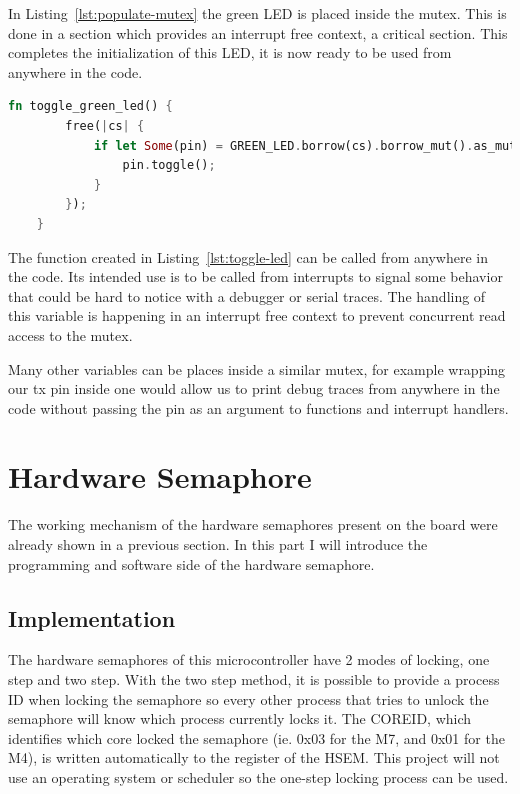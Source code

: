In Listing~\ref{lst:populate-mutex} the green LED is placed inside the mutex. This is done in a  section which provides an interrupt free context, a critical section. This completes the initialization of this LED, it is now ready to be used from anywhere in the code.

\begin{lstlisting}[language=Rust,frame=single,float=!ht,style=customrust,label={lst:toggle-led},caption={A LED Toggle Function}]
    fn toggle_green_led() {
        free(|cs| {
            if let Some(pin) = GREEN_LED.borrow(cs).borrow_mut().as_mut() {
                pin.toggle();
            }
        });
    }
\end{lstlisting}

The function created in Listing~\ref{lst:toggle-led} can be called from anywhere in the code. Its intended use is to be called from interrupts to signal some behavior that could be hard to notice with a debugger or serial traces. The handling of this variable is happening in an interrupt free context to prevent concurrent read access to the mutex.

Many other variables can be places inside a similar mutex, for example wrapping our tx pin inside one would allow us to print debug traces from anywhere in the code without passing the pin as an argument to functions and interrupt handlers.

\section{Hardware Semaphore}

The working mechanism of the hardware semaphores present on the board were already shown in a previous section. In this part I will introduce the programming and software side of the hardware semaphore.

\subsection{Implementation}

The hardware semaphores of this microcontroller have 2 modes of locking, one step and two step. With the two step method, it is possible to provide a process ID when locking the semaphore so every other process that tries to unlock the semaphore will know which process currently locks it. The COREID, which identifies which core locked the semaphore (ie. 0x03 for the M7, and 0x01 for the M4), is written automatically to the register of the HSEM. This project will not use an operating system or scheduler so the one-step locking process can be used.

